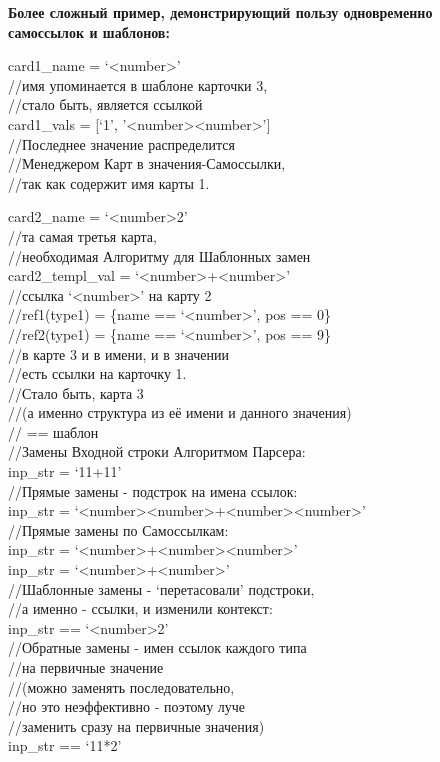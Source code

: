 \documentclass{book}
\newcommand{\less}{\textless}
\newcommand{\more}{\textgreater}
\begin{document}
\textbf{Более сложный пример, демонстрирующий пользу одновременно самоссылок и шаблонов:}

\begin{tcolorbox}[breakable]
card1\_name = `\less number\more' \\
//имя упоминается в шаблоне карточки 3,  \\
//стало быть, является ссылкой \\
card1\_vals = [`1', '\less number\more\less number\more']  \\
//Последнее значение распределится  \\
//Менеджером Карт в значения-Самоссылки, \\
//так как содержит имя карты 1.

card2\_name = `\less number\more*2' \\
//та самая третья карта, \\
//необходимая Алгоритму для Шаблонных замен \\
card2\_templ\_val = `\less number\more+\less number\more' \\
//ссылка `\less number\more' на карту 2 \\
//ref1(type1) = \{name == `\less number\more', pos == 0\} \\
//ref2(type1) = \{name == `\less number\more', pos == 9\} \\
//в карте 3 и в имени, и в значении \\
//есть ссылки на карточку 1. \\
//Стало быть, карта 3 \\
//(а именно структура из её имени и данного значения) \\
// == шаблон \\

//Замены Входной строки Алгоритмом Парсера: \\
inp\_str = `11+11' \\

//Прямые замены - подстрок на имена ссылок: \\
inp\_str = `\less number\more\less number\more+\less number\more\less number\more' \\
//Прямые замены по Самоссылкам: \\
inp\_str = `\less number\more+\less number\more\less number\more' \\
inp\_str = `\less number\more+\less number\more' \\

//Шаблонные замены - `перетасовали' подстроки, \\
//а именно - ссылки, и изменили контекст: \\
inp\_str == `\less number\more*2' \\

//Обратные замены - имен ссылок каждого типа \\
//на первичные значение \\
//(можно заменять последовательно, \\
//но это неэффективно - поэтому луче \\
//заменить сразу на первичные значения) \\
inp\_str == `11*2'
\end{tcolorbox}
\end{document}
